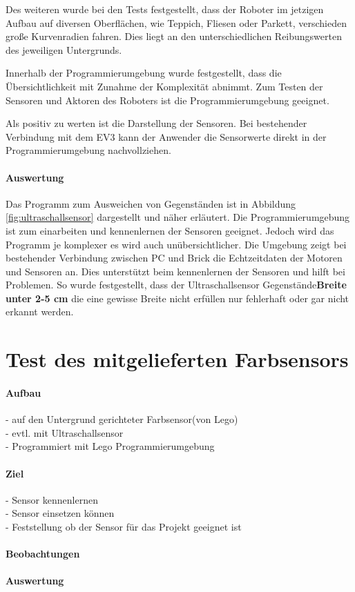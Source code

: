 Des weiteren wurde bei den Tests festgestellt, dass der Roboter im jetzigen Aufbau auf diversen Oberflächen, wie Teppich, Fliesen oder Parkett, verschieden große Kurvenradien fahren. Dies liegt an den unterschiedlichen Reibungswerten des jeweiligen Untergrunds.

Innerhalb der Programmierumgebung wurde festgestellt, dass die Übersichtlichkeit mit Zunahme der Komplexität abnimmt. Zum Testen der Sensoren und Aktoren des Roboters ist die Programmierumgebung geeignet.

Als positiv zu werten ist die Darstellung der Sensoren. Bei bestehender Verbindung mit dem EV3 kann der Anwender die Sensorwerte direkt in der Programmierumgebung nachvollziehen.

\paragraph{Auswertung}
Das Programm zum Ausweichen von Gegenständen ist in Abbildung \vref{fig:ultraschallsensor} dargestellt und näher erläutert. Die Programmierumgebung ist zum einarbeiten und kennenlernen der Sensoren geeignet. Jedoch wird das Programm je komplexer es wird auch unübersichtlicher. Die Umgebung zeigt bei bestehender Verbindung zwischen PC und Brick die Echtzeitdaten der Motoren und Sensoren an. Dies unterstützt beim kennenlernen der Sensoren und hilft bei Problemen. So wurde festgestellt, dass der Ultraschallsensor Gegenstände\textbf{Breite unter 2-5 cm} die eine gewisse Breite nicht erfüllen nur fehlerhaft oder gar nicht erkannt werden.  

\section{Test des mitgelieferten Farbsensors}
\paragraph{Aufbau}
- auf den Untergrund gerichteter Farbsensor(von Lego)\\
- evtl. mit Ultraschallsensor\\
- Programmiert mit Lego Programmierumgebung\\

\paragraph{Ziel}
- Sensor kennenlernen\\
- Sensor einsetzen können\\
- Feststellung ob der Sensor für das Projekt geeignet ist\\

\paragraph{Beobachtungen}
\paragraph{Auswertung}